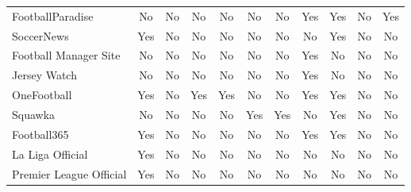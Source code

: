\begin{table}[h!]
\begin{tabular}{|l|c|c|c|c|c|c|c|c|c|c|}
FootballParadise      & No                     & No                  & No              & No                   & No                    & No                    & Yes                & Yes                 & No                  & Yes                  \\
SoccerNews            & Yes                    & No                  & No              & No                   & No                    & No                    & No                 & Yes                 & No                  & No                   \\
Football Manager Site & No                     & No                  & No              & No                   & No                    & No                    & Yes                & No                  & No                  & No                   \\
Jersey Watch          & No                     & No                  & No              & No                   & No                    & No                    & Yes                & No                  & No                  & No                   \\
OneFootball           & Yes                    & No                  & Yes             & Yes                  & No                    & No                    & Yes                & Yes                 & No                  & No                   \\
Squawka               & No                     & No                  & No              & No                   & Yes                   & Yes                   & No                 & Yes                 & No                  & No                   \\
Football365           & Yes                    & No                  & No              & No                   & No                    & No                    & Yes                & Yes                 & No                  & No                   \\
La Liga Official      & Yes                    & No                  & No              & No                   & No                    & No                    & No                 & No                  & No                  & No                   \\
Premier League Official & Yes                  & No                  & No              & No                   & No                    & No                    & No                 & No                  & No                  & No                   \\

\end{tabular}
\end{table}
